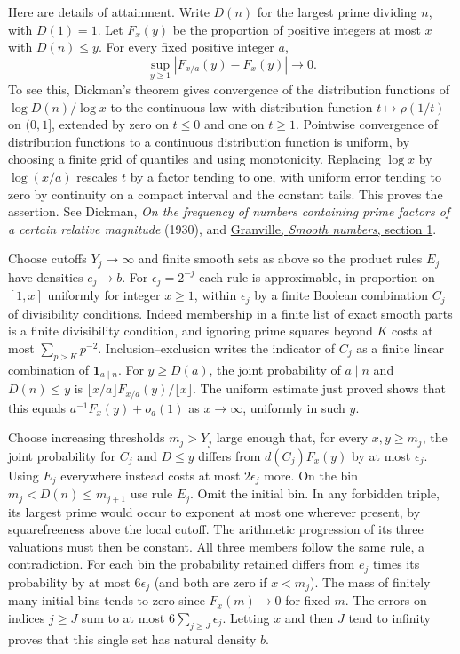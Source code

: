 Here are details of attainment. Write $D(n)$ for the largest prime dividing $n$, with $D(1)=1$. Let $F_x(y)$ be the proportion of positive integers at most $x$ with $D(n)\le y$. For every fixed positive integer $a$,
\[
                 \sup_{y\ge1}|F_{x/a}(y)-F_x(y)|\longrightarrow0 .
\]
To see this, Dickman's theorem gives convergence of the distribution functions of $\log D(n)/\log x$ to the continuous law with distribution function $t\mapsto\rho(1/t)$ on $(0,1]$, extended by zero on $t\le0$ and one on $t\ge1$. Pointwise convergence of distribution functions to a continuous distribution function is uniform, by choosing a finite grid of quantiles and using monotonicity. Replacing $\log x$ by $\log(x/a)$ rescales $t$ by a factor tending to one, with uniform error tending to zero by continuity on a compact interval and the constant tails. This proves the assertion. See Dickman, \emph{On the frequency of numbers containing prime factors of a certain relative magnitude} (1930), and \href{https://library.slmath.org/books/Book44/files/09andrew.pdf}{Granville, \emph{Smooth numbers}, section 1}.

Choose cutoffs $Y_j\to\infty$ and finite smooth sets as above so the product rules $E_j$ have densities $e_j\to b$. For $\epsilon_j=2^{-j}$ each rule is approximable, in proportion on $[1,x]$ uniformly for integer $x\ge1$, within $\epsilon_j$ by a finite Boolean combination $C_j$ of divisibility conditions. Indeed membership in a finite list of exact smooth parts is a finite divisibility condition, and ignoring prime squares beyond $K$ costs at most $\sum_{p>K}p^{-2}$. Inclusion--exclusion writes the indicator of $C_j$ as a finite linear combination of $\mathbf1_{a\mid n}$. For $y\ge D(a)$, the joint probability of $a\mid n$ and $D(n)\le y$ is $\lfloor x/a\rfloor F_{x/a}(y)/\lfloor x\rfloor$. The uniform estimate just proved shows that this equals $a^{-1}F_x(y)+o_a(1)$ as $x\to\infty$, uniformly in such $y$.

Choose increasing thresholds $m_j>Y_j$ large enough that, for every $x,y\ge m_j$, the joint probability for $C_j$ and $D\le y$ differs from $d(C_j)F_x(y)$ by at most $\epsilon_j$. Using $E_j$ everywhere instead costs at most $2\epsilon_j$ more. On the bin $m_j<D(n)\le m_{j+1}$ use rule $E_j$. Omit the initial bin. In any forbidden triple, its largest prime would occur to exponent at most one wherever present, by squarefreeness above the local cutoff. The arithmetic progression of its three valuations must then be constant. All three members follow the same rule, a contradiction. For each bin the probability retained differs from $e_j$ times its probability by at most $6\epsilon_j$ (and both are zero if $x<m_j$). The mass of finitely many initial bins tends to zero since $F_x(m)\to0$ for fixed $m$. The errors on indices $j\ge J$ sum to at most $6\sum_{j\ge J}\epsilon_j$. Letting $x$ and then $J$ tend to infinity proves that this single set has natural density $b$.

